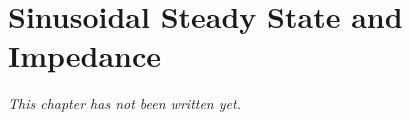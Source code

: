 \chapter{Sinusoidal Steady State and Impedance}\label{ch:b1:sinusoidal-impedance}


\emph{This chapter has not been written yet.}
